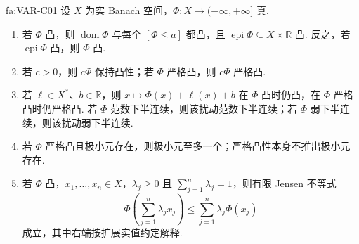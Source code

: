 \begin{FAProposition}[C][凸泛函计算工具]{fa:VAR-C01}
设 \(\displaystyle X\) 为实 Banach 空间，\(\displaystyle\Phi:X\to(-\infty,+\infty]\) 真.
\begin{enumerate}
\item 若 \(\displaystyle\Phi\) 凸，则 \(\displaystyle\operatorname{dom}\Phi\) 与每个 \(\displaystyle[\Phi\leqslant a]\) 都凸，且 \(\displaystyle\operatorname{epi}\Phi\subseteq X\times\mathbb R\) 凸. 反之，若 \(\displaystyle\operatorname{epi}\Phi\) 凸，则 \(\displaystyle\Phi\) 凸.
\item 若 \(\displaystyle c>0\)，则 \(\displaystyle c\Phi\) 保持凸性；若 \(\displaystyle\Phi\) 严格凸，则 \(\displaystyle c\Phi\) 严格凸.
\item 若 \(\displaystyle\ell\in X^*\)、\(\displaystyle b\in\mathbb R\)，则 \(\displaystyle x\mapsto\Phi(x)+\ell(x)+b\) 在 \(\displaystyle\Phi\) 凸时仍凸，在 \(\displaystyle\Phi\) 严格凸时仍严格凸. 若 \(\displaystyle\Phi\) 范数下半连续，则该扰动范数下半连续；若 \(\displaystyle\Phi\) 弱下半连续，则该扰动弱下半连续.
\item 若 \(\displaystyle\Phi\) 严格凸且极小元存在，则极小元至多一个；严格凸性本身不推出极小元存在.
\item 若 \(\displaystyle\Phi\) 凸，\(\displaystyle x_1,\dots,x_n\in X\)，\(\displaystyle\lambda_j\geqslant0\) 且 \(\displaystyle\sum_{j=1}^n\lambda_j=1\)，则有限 Jensen 不等式
\[
\Phi\!\left(\sum_{j=1}^n\lambda_jx_j\right)
\leqslant
\sum_{j=1}^n\lambda_j\Phi(x_j)
\]
成立，其中右端按扩展实值约定解释.
\end{enumerate}
\end{FAProposition}

